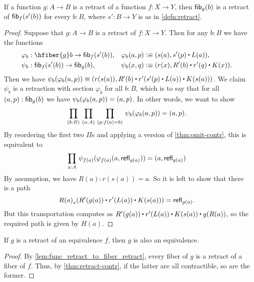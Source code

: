 \begin{lem}\label{lem:func_retract_to_fiber_retract}
If a function $g:A\to B$ is a retract of a function $f:X\to Y$, then ${\mathsf{fib}}_{g}(b)$ is a retract of ${\mathsf{fib}}_{f}(s'(b))$
for every $b:B$, where $s':B\to Y$ is as in \autoref{defn:retract}.
\end{lem}

\begin{proof}
Suppose that $g:A\to B$ is a retract of $f:X\to Y$. Then for any $b:B$ we have the functions
\begin{align*}
\varphi_b &:\hfiber{g}b\to\hfib{f}{s'(b)}, &
\varphi_b(a,p) & \defeq \pairr{s(a),s'(p)\ct L(a)},\\
\psi_b &:\hfib{f}{s'(b)}\to\hfib{g}b, &
\psi_b(x,q) &\defeq \pairr{r(x),R'(b)\ct r'(q)\ct K(x)}.
\end{align*}
Then we have $\psi_b(\varphi_b({a,p}))\equiv\pairr{r(s(a)),R'(b)\ct r'(s'(p)\ct L(a))\ct K(s(a))}$.
We claim $\psi_b$ is a retraction with section $\varphi_b$ for all $b:B$, which is to say that for all $(a,p):{\mathsf{fib}}_{g}(b)$ we have $\psi_b(\varphi_b({a,p}))= {\mathopen{}(a,p)\mathclose{}}$.
In other words, we want to show
\begin{equation*}
\prd{b:B}{a:A}{p:f(a)=b} \psi_b(\varphi_b({a,p}))= \pairr{a,p}.
\end{equation*}
By reordering the first two $\Pi$s and applying a version of \autoref{thm:omit-contr}, this is equivalent to
\begin{equation*}
\prd{a:A}\psi_{f(a)}(\varphi_{f(a)}({a,\refl{g(a)}}))=\pairr{a,\refl{g(a)}}
\end{equation*}
By assumption, we have $R(a):r(s(a))= a$. So it is left to show that there is a path
\begin{equation*}
\trans{R(a)}{R'(g(a))\ct r'(L(a))\ct K(s(a))} = \refl{g(a)}.
\end{equation*}
But this transportation computes as $R'(g(a))\ct r'(L(a))\ct K(s(a))\ct g(R(a))$, so the required path is given by $H(a)$.
\end{proof}

\begin{thm}\label{thm:retract-equiv}
  If $g$ is a retract of an equivalence $f$, then $g$ is also an equivalence.
\end{thm}
\begin{proof}
  By \autoref{lem:func_retract_to_fiber_retract}, every fiber of $g$ is a retract of a fiber of $f$.
  Thus, by \autoref{thm:retract-contr}, if the latter are all contractible, so are the former.
\end{proof}


